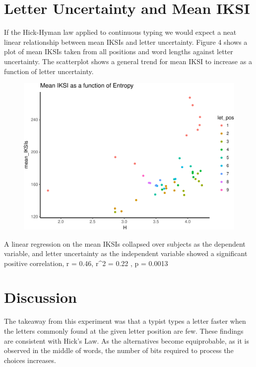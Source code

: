 \documentclass[floatsintext,man]{apa6}
\theoremstyle{definition}
\theoremstyle{definition}
\theoremstyle{definition}
\theoremstyle{remark}
\begin{document}
\section{Letter Uncertainty and Mean
IKSI}\label{letter-uncertainty-and-mean-iksi}

If the Hick-Hyman law applied to continuous typing we would expect a
neat linear relationship between mean IKSIs and letter uncertainty.
Figure 4 shows a plot of mean IKSIs taken from all positions and word
lengths against letter uncertainty. The scatterplot shows a general
trend for mean IKSI to increase as a function of letter uncertainty.

\begin{figure}[htbp]
\centering
\includegraphics{Entropy_typing_draft_files/figure-latex/letter_uncertainty_by_IKSI-1.pdf}
\caption{}
\end{figure}

A linear regression on the mean IKSIs collapsed over subjects as the
dependent variable, and letter uncertainty as the independent variable
showed a significant positive correlation, r = 0.46, r\^{}2 = 0.22 , p =
0.0013

\section{Discussion}\label{discussion}

The takeaway from this experiment was that a typist types a letter
faster when the letters commonly found at the given letter position are
few. These findings are consistent with Hick's Law. As the alternatives
become equiprobable, as it is observed in the middle of words, the
number of bits required to process the choices increases.
\end{document}
